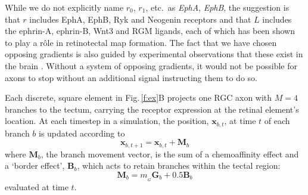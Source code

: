 \documentclass[11pt, a4paper]{article}
\begin{document}
While we do not explicitly name $r_0$, $r_1$,
etc.~as \emph{EphA}, \emph{EphB}, the suggestion is that $r$ includes EphA,
EphB, Ryk \citep{schmitt_wntryk_2006} and
Neogenin \citep{rajagopalan_neogenin_2004} receptors and that $L$ includes the
ephrin-A, ephrin-B, Wnt3 \citep{schmitt_wntryk_2006} and
RGM \citep{monnier_rgm_2002} ligands, each of which has been shown to play a
r\^ole in retinotectal map formation. The fact that we have chosen opposing
gradients is also guided by experimental observations that these exist in the
brain \citep{opposing_gradients}. Without a system of opposing gradients, it
would not be possible for axons to stop without an additional signal
instructing them to do so.




Each discrete, square element in Fig.\,\ref{f:ex}B projects one RGC axon with $M=4$
branches to the tectum, carrying the receptor expression at the retinal
element's location.
At each timestep in a simulation, the position, $\mathbf{x}_{b,t}$, at time
$t$ of each branch $b$ is updated according to
%
\begin{equation}
\mathbf{x}_{b,t+1} = \mathbf{x}_{b,t} + \mathbf{M}_{b}
\end{equation}
%
where $\mathbf{M}_{b}$, the branch movement vector, is the sum of a chemoaffinity
effect and a `border effect', $\mathbf{B}_b$, which acts to retain branches
within the tectal region:
%
\begin{equation} \label{e:mv}
\mathbf{M}_{b} = m_{\!_G} \mathbf{G}_b + 0.5 \mathbf{B}_b
\end{equation}
%
evaluated at time $t$.
\end{document}

